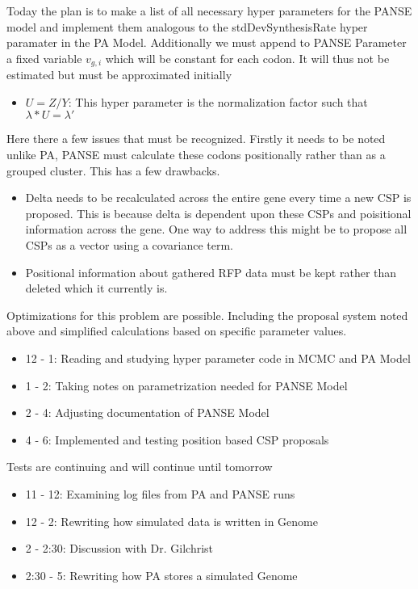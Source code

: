 \documentclass[12pt,hyperref]{labbook}
\begin{document}
Today the plan is to make a list of all necessary hyper parameters for the PANSE model and implement
them analogous to the stdDevSynthesisRate hyper paramater in the PA Model. Additionally we must append to PANSE Parameter a fixed 
variable $v_{g,i}$ which will be constant for each codon. It will thus not be estimated but must be approximated initially
\begin{itemize}
 \item $U = Z/Y$: This hyper parameter is the normalization factor such that $\lambda * U = \lambda'$
\end{itemize}
Here there a few issues that must be recognized. Firstly it needs to be noted unlike PA, PANSE must calculate these codons positionally
rather than as a grouped cluster. This has a few drawbacks.
\begin{itemize}
 \item Delta needs to be recalculated across the entire gene every time a new CSP is proposed. This is because delta is dependent
 upon these CSPs and poisitional information across the gene. One way to address this might be to propose all CSPs as a vector
 using a covariance term.
 \item Positional information about gathered RFP data must be kept rather than deleted which it currently is.
\end{itemize}
Optimizations for this problem are possible. Including the proposal system noted above and simplified calculations based on specific
parameter values.
\begin{itemize}
 \item 12 - 1: Reading and studying hyper parameter code in MCMC and PA Model
 \item 1 - 2: Taking notes on parametrization needed for PANSE Model
 \item 2 - 4: Adjusting documentation of PANSE Model
 \item 4 - 6: Implemented and testing position based CSP proposals
\end{itemize}
Tests are continuing and will continue until tomorrow
\begin{itemize}
 \item 11 - 12: Examining log files from PA and PANSE runs
 \item 12 - 2: Rewriting how simulated data is written in Genome
 \item 2 - 2:30: Discussion with Dr. Gilchrist
 \item 2:30 - 5: Rewriting how PA stores a simulated Genome
\end{itemize}
\end{document}

